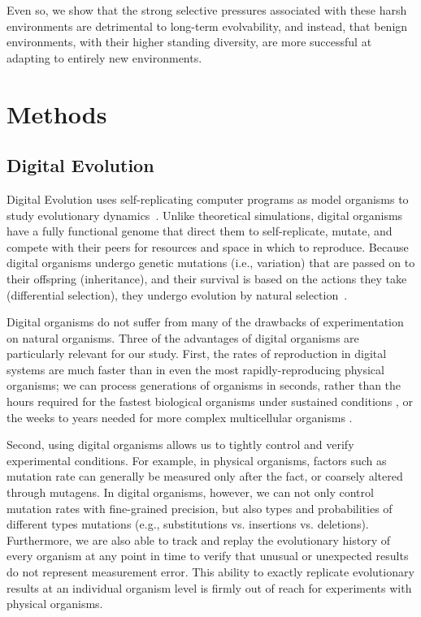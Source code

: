 \documentclass[10pt,letterpaper,final]{article}
\begin{document}
Even so, we show that the strong selective pressures associated with these harsh environments are detrimental to long-term evolvability, and instead, that benign environments, with their higher standing diversity, are more successful at adapting to entirely new environments.


\section*{Methods}

\subsection*{Digital Evolution}
Digital Evolution uses self-replicating computer programs as model organisms to study evolutionary dynamics~\cite{mckinley_harnessing_2008}. Unlike theoretical simulations, digital organisms have a fully functional genome that direct them to self-replicate, mutate, and compete with their peers for resources and space in which to reproduce. Because digital organisms undergo genetic mutations (i.e., variation) that are passed on to their offspring (inheritance), and their survival is based on the actions they take (differential selection), they undergo evolution by natural selection~\cite{dennett_darwins_1995}.

Digital organisms do not suffer from many of the drawbacks of experimentation on natural organisms.  Three of the advantages of digital organisms are particularly relevant for our study.  First, the rates of reproduction in digital systems are much faster than in even the most rapidly-reproducing physical organisms; we can process generations of organisms in seconds, rather than the hours required for the fastest biological organisms under sustained conditions \cite{ryan_evolution_1953,lenski_long-term_1991}, or the weeks to years needed for more complex multicellular organisms \cite{anderson_outcrossing_2010,stearns_experimental_2000}.

Second, using digital organisms allows us to tightly control and verify experimental conditions. For example, in physical organisms, factors such as mutation rate can generally be measured only after the fact, or coarsely altered through mutagens. In digital organisms, however, we can not only control mutation rates with fine-grained precision, but also types and probabilities of different types mutations (e.g., substitutions vs. insertions vs. deletions). Furthermore, we are also able to track and replay the evolutionary history of every organism at any point in time to verify that unusual or unexpected results do not represent measurement error. This ability to exactly replicate evolutionary results at an individual organism level is firmly out of reach for experiments with physical organisms.
\end{document}
